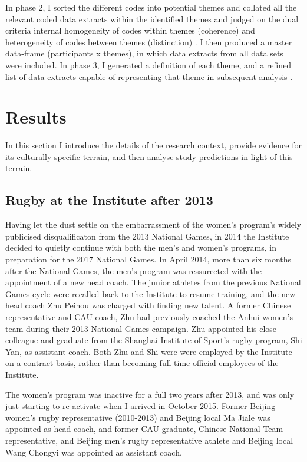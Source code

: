 In phase 2, I sorted the different codes into potential themes and collated all the relevant coded data extracts within the identified themes and judged on the dual criteria internal homogeneity of codes within themes (coherence) and heterogeneity of codes between themes (distinction) \citep{Patton1990}.  I then produced a master data-frame (participants x themes), in which data extracts from all data sets were included.  In phase 3, I generated a definition of each theme, and a refined list of data extracts capable of representing that theme in subsequent analysis \citep{Braun2006}.









\section{Results}

In this section I introduce the details of the research context, provide evidence for its culturally specific terrain, and then analyse study predictions in light of this terrain.

\subsection{Rugby at the Institute after 2013}
Having let the dust settle on the embarrassment of the women's program's widely publicised disqualificaton from the 2013 National Games, in 2014 the Institute decided to quietly continue with both the men's and women's programs, in preparation for the 2017 National Games.  In April 2014, more than six months after the National Games, the men's program was ressurected with the appointment of a new head coach. The junior athletes from the previous National Games cycle were recalled back to the Institute to resume training, and the new head coach Zhu Peihou was charged with finding new talent. A former Chinese representative and CAU coach, Zhu had previously coached the Anhui women's team during their 2013 National Games campaign.  Zhu appointed his close colleague and graduate from the Shanghai Institute of Sport's rugby program, Shi Yan, as assistant coach.  Both Zhu and Shi were were employed by the Institute on a contract basis, rather than becoming full-time official employees of the Institute.

The women's program was inactive for a full two years after 2013, and was only just starting to re-activate when I arrived in October 2015.  Former Beijing women's rugby representative (2010-2013) and Beijing local Ma Jiale was appointed as head coach, and former CAU graduate, Chinese National Team representative, and Beijing men's rugby representative athlete and Beijing local Wang Chongyi was appointed as assistant coach.

